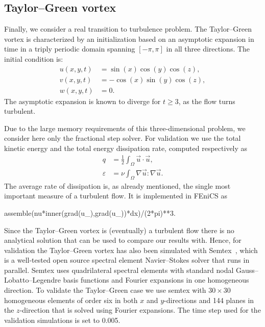 \subsection{Taylor--Green vortex}
\label{sec:mortensen:TG}

Finally, we consider a real transition to turbulence problem. The
Taylor--Green vortex is characterized by an initialization based on
an asymptotic expansion in time in a triply periodic domain spanning
$[-\pi,\pi]$ in all three directions. The initial condition is:
\begin{align}
 u(x,y,t)&=\sin(x)\cos(y)\cos(z),
\\
 v(x,y,t)&=-\cos(x)\sin(y)\cos(z),
\\
 w(x,y,t)&=0.
\end{align}
The asymptotic expansion is known to diverge for $t \ge 3$, as the flow
turns turbulent.

Due to the large memory requirements of this three-dimensional
problem, we consider here only the fractional step solver. For validation
we use the total kinetic energy and the total energy dissipation rate,
computed respectively as
\begin{align}
 q &= \frac{1}{2} \int_{\Omega} \vec{u} \cdot \vec{u}, \label{eq:mortensen:q}
\\
 \varepsilon &= \nu \int_{\Omega} \nabla \vec{u}: \nabla \vec{u}. \label{eq:mortensen:diss}
\end{align}
The average rate of dissipation is, as already mentioned, the single
most important measure of a turbulent flow. It is implemented in FEniCS as
\begin{python}
assemble(nu*inner(grad(u_),grad(u_))*dx)/(2*pi)**3.
\end{python}

Since the Taylor--Green vortex is (eventually) a turbulent flow there
is no analytical solution that can be used to compare our results
with. Hence, for validation the Taylor--Green vortex has also been
simulated with Semtex~\citep{Blackburn2009}, which is a well-tested
open source spectral element Navier--Stokes solver that runs in
parallel. Semtex uses quadrilateral spectral elements with standard
nodal Gauss--Lobatto--Legendre basis functions and Fourier expansions
in one homogeneous direction. To validate the Taylor--Green case we
use semtex with $30 \times 30$ homogeneous elements of order six in both $x$
and $y$-directions and 144 planes in the $z$-direction that is solved
using Fourier expansions. The time step used for the validation simulations
is set to 0.005.

